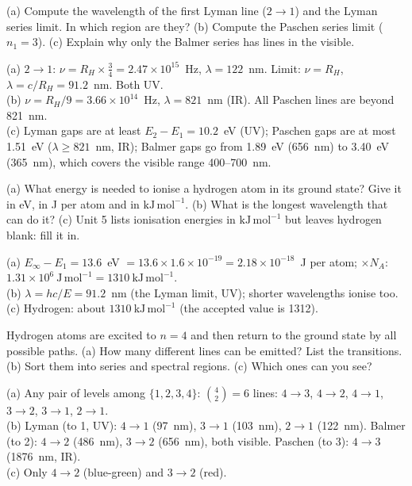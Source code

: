 (a) Compute the wavelength of the first Lyman line ($2\to1$) and the Lyman series limit. In which
region are they? (b) Compute the Paschen series limit ($n_1 = 3$). (c) Explain why only the Balmer
series has lines in the visible.
\begin{solution}
(a) $2\to1$: $\nu = R_H\times\frac34 = 2.47\times10^{15}$~Hz, $\lambda = 122$~nm. Limit:
$\nu = R_H$, $\lambda = c/R_H = 91.2$~nm. Both UV.\\
(b) $\nu = R_H/9 = 3.66\times10^{14}$~Hz, $\lambda = 821$~nm (IR). All Paschen lines are beyond
821~nm.\\
(c) Lyman gaps are at least $E_2 - E_1 = 10.2$~eV (UV); Paschen gaps are at most 1.51~eV
($\lambda\ge821$~nm, IR); Balmer gaps go from 1.89~eV (656~nm) to 3.40~eV (365~nm), which covers
the visible range 400--700~nm.
\end{solution}

(a) What energy is needed to ionise a hydrogen atom in its ground state? Give it in eV, in J per atom
and in $\mathrm{kJ\,mol^{-1}}$. (b) What is the longest wavelength that can do it?
(c) Unit 5 lists ionisation energies in $\mathrm{kJ\,mol^{-1}}$ but leaves hydrogen blank: fill it in.
\begin{solution}
(a) $E_\infty - E_1 = 13.6$~eV $= 13.6\times1.6\times10^{-19} = 2.18\times10^{-18}$~J per atom;
$\times N_A$: $1.31\times10^{6}\ \mathrm{J\,mol^{-1}} = 1310\ \mathrm{kJ\,mol^{-1}}$.\\
(b) $\lambda = hc/E = 91.2$~nm (the Lyman limit, UV); shorter wavelengths ionise too.\\
(c) Hydrogen: about $1310\ \mathrm{kJ\,mol^{-1}}$ (the accepted value is 1312).
\end{solution}

Hydrogen atoms are excited to $n = 4$ and then return to the ground state by all possible paths.
(a) How many different lines can be emitted? List the transitions. (b) Sort them into series and
spectral regions. (c) Which ones can you see?
\begin{solution}
(a) Any pair of levels among $\{1,2,3,4\}$: $\binom42 = 6$ lines:
$4\to3$, $4\to2$, $4\to1$, $3\to2$, $3\to1$, $2\to1$.\\
(b) Lyman (to 1, UV): $4\to1$ (97~nm), $3\to1$ (103~nm), $2\to1$ (122~nm). Balmer (to 2):
$4\to2$ (486~nm), $3\to2$ (656~nm), both visible. Paschen (to 3): $4\to3$ (1876~nm, IR).\\
(c) Only $4\to2$ (blue-green) and $3\to2$ (red).
\end{solution}

